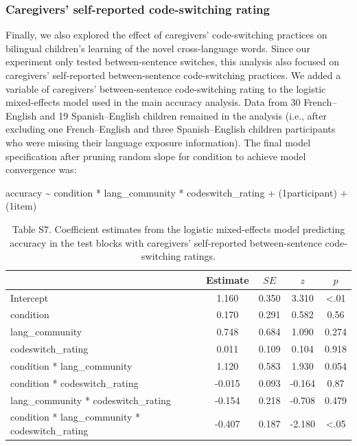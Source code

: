 \documentclass[
  man,floatsintext]{apa7}
\begin{document}
\hypertarget{caregivers-self-reported-code-switching-rating}{%
\subsubsection{Caregivers' self-reported code-switching rating}\label{caregivers-self-reported-code-switching-rating}}

Finally, we also explored the effect of caregivers' code-switching practices on bilingual children's learning of the novel cross-language words. Since our experiment only tested between-sentence switches, this analysis also focused on caregivers' self-reported between-sentence code-switching practices. We added a variable of caregivers' between-sentence code-switching rating to the logistic mixed-effects model used in the main accuracy analysis. Data from 30 French--English and 19 Spanish--English children remained in the analysis (i.e., after excluding one French--English and three Spanish--English children participants who were missing their language exposure information). The final model specification after pruning random slope for condition to achieve model convergence was:

accuracy \textasciitilde{} condition * lang\_community * codeswitch\_rating + (1\textbar participant) + (1\textbar item)

\begin{table}[H]

\begin{center}
\begin{threeparttable}

\caption{\label{tab:unnamed-chunk-20}Table S7. Coefficient estimates from the logistic mixed-effects model predicting accuracy in the test blocks with caregivers’ self-reported between-sentence code-switching ratings.}

\begin{tabular}{lcccc}
\toprule
 & Estimate & $SE$ & $z$ & $p$\\
\midrule
Intercept & 1.160 & 0.350 & 3.310 & <.01\\
condition & 0.170 & 0.291 & 0.582 & 0.56\\
lang\_community & 0.748 & 0.684 & 1.090 & 0.274\\
codeswitch\_rating & 0.011 & 0.109 & 0.104 & 0.918\\
condition * lang\_community & 1.120 & 0.583 & 1.930 & 0.054\\
condition * codeswitch\_rating & -0.015 & 0.093 & -0.164 & 0.87\\
lang\_community * codeswitch\_rating & -0.154 & 0.218 & -0.708 & 0.479\\
condition * lang\_community * codeswitch\_rating & -0.407 & 0.187 & -2.180 & <.05\\
\bottomrule
\end{tabular}

\end{threeparttable}
\end{center}

\end{table}
\end{document}
